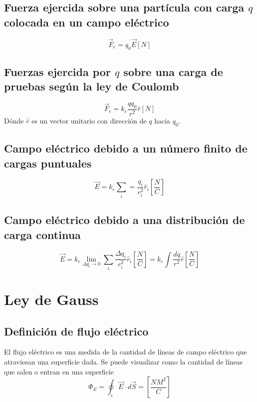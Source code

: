 \documentclass{report}
\begin{document}
    \subsection*{Fuerza ejercida sobre una partícula con carga $q$ colocada en un campo eléctrico}
      \begin{equation*}
        \overrightarrow{F}_e=q_0\overrightarrow{E}[N]
      \end{equation*}
    \subsection*{Fuerzas ejercida por $q$ sobre una carga de pruebas según la ley de Coulomb}
      \begin{equation*}
        \overrightarrow{F}_e=k_e\frac{qq_0}{r^2}\hat{r}[N]
      \end{equation*}
      Dónde $\hat{r}$ es un vector unitario con dirección de $q$ hacia $q_0$.
    \subsection*{Campo eléctrico debido a un número finito de cargas puntuales}
      \begin{equation*}
        \overrightarrow{E}=k_e\sum_{i}=\frac{q_i}{r_i^2}\hat{r}_i\left[\frac{N}{C}\right]
      \end{equation*}
    \subsection*{Campo eléctrico debido a una distribución de carga continua}
      \begin{equation*}
        \overrightarrow{E}=k_e\lim_{\Delta q_i\to0}\sum_{i}\frac{\Delta q_i}{r_i^2}\hat{r}_i
        \left[\frac{N}{C}\right]=k_e\int\frac{dq}{r^2}\hat{r}\left[\frac{N}{C}\right]
      \end{equation*}
  \section*{Ley de Gauss}
    \subsection*{Definición de flujo eléctrico}
      El flujo eléctrico es una medida de la cantidad de líneas de campo eléctrico que atraviesan 
      una superficie dada. Se puede visualizar como la cantidad de líneas que salen o entran en una superficie
      \begin{equation*}
        \Phi_E=\oint_s\overrightarrow{E}\cdot d\overrightarrow{S}=\left[\frac{NM^2}{C}\right]
      \end{equation*}
\end{document}
